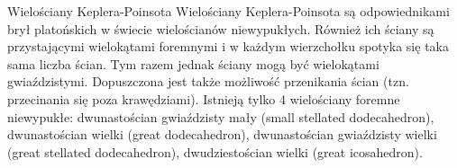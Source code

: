 

Wielościany Keplera-Poinsota
Wielościany Keplera-Poinsota są odpowiednikami brył platońskich w świecie wielościanów niewypukłych. Również ich ściany są przystającymi wielokątami foremnymi i w każdym wierzchołku spotyka się taka sama liczba ścian. Tym razem jednak ściany mogą być wielokątami gwiaździstymi. Dopuszczona jest także możliwość przenikania ścian (tzn. przecinania się poza krawędziami).
Istnieją tylko 4 wielościany foremne niewypukłe:
dwunastościan gwiaździsty mały (small stellated dodecahedron),
dwunastościan wielki (great dodecahedron),
dwunastościan gwiaździsty wielki (great stellated dodecahedron),
dwudziestościan wielki (great icosahedron). 